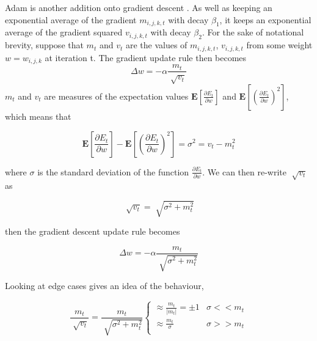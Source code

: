 Adam is another addition onto gradient descent \cite{Adam}. As well as keeping an exponential average of the gradient $m_{i,j,k,t}$ with decay $\beta_1$, it keeps an exponential average of the gradient squared $v_{i,j,k,t}$ with decay $\beta_2$. For the sake of notational brevity, suppose that $m_t$ and $v_t$ are the values of $m_{i,j,k,t}$, $v_{i,j,k,t}$ from some weight $w = w_{i,j,k}$ at iteration t. The gradient update rule then becomes 
\begin{equation}
\Delta w = - \alpha \frac{m_{t}}{\sqrt[]{v_{t}}}
\end{equation}
$m_t$ and $v_t$ are measures of the expectation values $\mathbf{E}[\frac{\partial E_t}{\partial w}]$ and $\mathbf{E}[(\frac{\partial E_t}{\partial w})^2]$, which means that

\begin{equation}
\mathbf{E}[\frac{\partial E_t}{\partial w}] - \mathbf{E}[(\frac{\partial E_t}{\partial w})^2] = \sigma^2 = v_t - m_t^2 
\end{equation}

where $\sigma$ is the standard deviation of the function $\frac{\partial E_t}{\partial w}$. We can then re-write $\sqrt[]{v_{t}}$ as 

\begin{equation}
\sqrt[]{v_t} = \sqrt[]{\sigma^2 + m_t^2}
\end{equation}

then the gradient descent update rule becomes 

\begin{equation}
\Delta w = - \alpha \frac{m_{t}}{\sqrt[]{\sigma^2 + m_t^2}}
\end{equation}

Looking at edge cases gives an idea of the behaviour,

\begin{equation} \frac{m_{t}}{\sqrt[]{v_{t}}} = \frac{m_{t}}{\sqrt[]{\sigma^2 + m_t^2}}  \begin{cases} 
      \approx \frac{m_{t}}{|m_t|} = \pm 1 & \sigma << m_t \\
      \approx \frac{m_t}{\sigma} & \sigma >> m_t \\
   \end{cases}
\end{equation}

